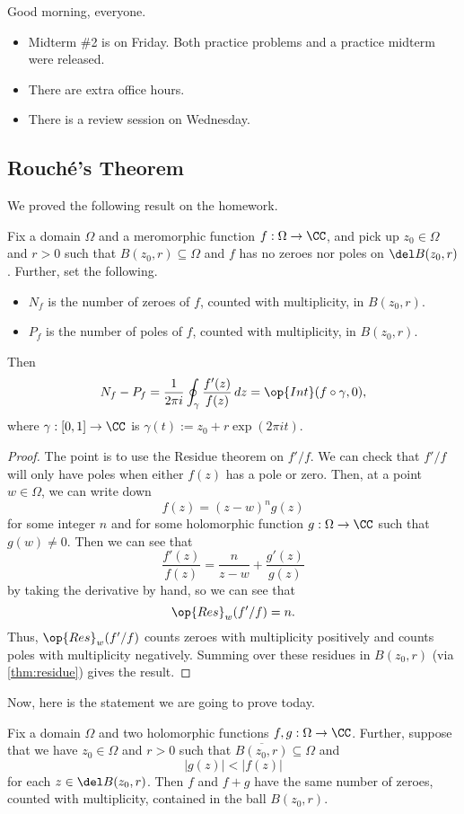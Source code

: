 
Good morning, everyone.
\begin{itemize}
	\item Midterm \#2 is on Friday. Both practice problems and a practice midterm were released.
	\item There are extra office hours.
	\item There is a review session on Wednesday.
\end{itemize}

\subsection{Rouch\'e's Theorem}
We proved the following result on the homework.
\begin{theorem} \label{thm:argpri}
	Fix a domain $\Omega$ and a meromorphic function $f:\Omega\to\CC$, and pick up $z_0\in\Omega$ and $r>0$ such that $B(z_0,r)\subseteq\Omega$ and $f$ has no zeroes nor poles on $\del B(z_0,r)$. Further, set the following.
	\begin{itemize}
		\item $N_f$ is the number of zeroes of $f$, counted with multiplicity, in $B(z_0,r)$.
		\item $P_f$ is the number of poles of $f$, counted with multiplicity, in $B(z_0,r)$.
	\end{itemize}
	Then
	\[N_f-P_f=\frac1{2\pi i}\oint_\gamma\frac{f'(z)}{f(z)}\,dz=\op{Int}(f\circ\gamma,0),\]
	where $\gamma:[0,1]\to\CC$ is $\gamma(t):=z_0+r\exp(2\pi it)$.
\end{theorem}
\begin{proof}
	The point is to use the Residue theorem on $f'/f$. We can check that $f'/f$ will only have poles when either $f(z)$ has a pole or zero. Then, at a point $w\in\Omega$, we can write down
	\[f(z)=(z-w)^ng(z)\]
	for some integer $n$ and for some holomorphic function $g:\Omega\to\CC$ such that $g(w)\ne0$. Then we can see that
	\[\frac{f'(z)}{f(z)}=\frac n{z-w}+\frac{g'(z)}{g(z)}\]
	by taking the derivative by hand, so we can see that
	\[\op{Res}_w(f'/f)=n.\]
	Thus, $\op{Res}_w(f'/f)$ counts zeroes with multiplicity positively and counts poles with multiplicity negatively. Summing over these residues in $B(z_0,r)$ (via \autoref{thm:residue}) gives the result.
\end{proof}
Now, here is the statement we are going to prove today.
\begin{theorem}[Rouch\'e's] \label{thm:rou}
	Fix a domain $\Omega$ and two holomorphic functions $f,g:\Omega\to\CC$. Further, suppose that we have $z_0\in\Omega$ and $r>0$ such that $\overline{B(z_0,r)}\subseteq\Omega$ and
	\[|g(z)|<|f(z)|\]
	for each $z\in\del B(z_0,r)$. Then $f$ and $f+g$ have the same number of zeroes, counted with multiplicity, contained in the ball $B(z_0,r)$.
\end{theorem}
